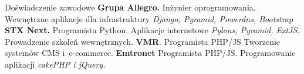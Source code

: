 \begin{rubric}{Doświadczenie zawodowe}
\entry*[X 2013 -- obecnie]\textbf{Grupa Allegro.}\newline
    Inżynier oprogramowania.\newline
    Wewnętrzne aplikacje dla infrastruktury\newline
    \textit{Django, Pyramid, Powerdns, Bootstrap}
\entry*[V 2011 -- IX 2013]\textbf{STX Next.}\newline
    Programista Python.\newline
    Aplikacje internetowe \newline
    \textit{Pylons, Pyramid, ExtJS.}\newline
    Prowadzenie szkoleń wewnętrznych.
\entry*[XII 2009 -- IV 2011]\textbf{VMR}.
    Programista PHP/JS\newline
    Tworzenie systemów CMS i~\hbox{e-commerce}.
\entry*[VI 2009 -- XII 2009]\textbf{Emtronet} Programista PHP/JS.\newline
    Programowanie aplikacji\newline
    \textit{cakePHP i jQuery.}
\end{rubric}
